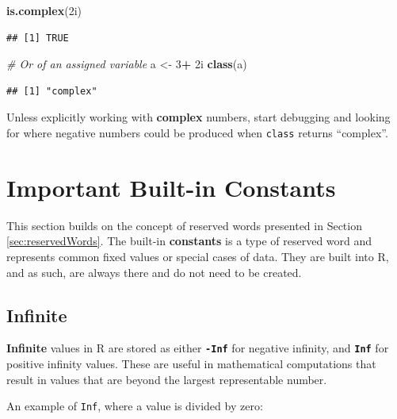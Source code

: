 \documentclass[
]{book}
\newenvironment{Shaded}{\begin{snugshade}}{\end{snugshade}}
\newcommand{\CommentTok}[1]{\textcolor[rgb]{0.56,0.35,0.01}{\textit{#1}}}
\newcommand{\DataTypeTok}[1]{\textcolor[rgb]{0.13,0.29,0.53}{#1}}
\newcommand{\DecValTok}[1]{\textcolor[rgb]{0.00,0.00,0.81}{#1}}
\newcommand{\FunctionTok}[1]{\textcolor[rgb]{0.13,0.29,0.53}{\textbf{#1}}}
\newcommand{\NormalTok}[1]{#1}
\newcommand{\OtherTok}[1]{\textcolor[rgb]{0.56,0.35,0.01}{#1}}
\newcommand{\SpecialCharTok}[1]{\textcolor[rgb]{0.81,0.36,0.00}{\textbf{#1}}}
\begin{document}
\begin{Shaded}
\begin{Highlighting}[]
\FunctionTok{is.complex}\NormalTok{(}\DecValTok{2}\DataTypeTok{i}\NormalTok{)}
\end{Highlighting}
\end{Shaded}

\begin{verbatim}
## [1] TRUE
\end{verbatim}

\begin{Shaded}
\begin{Highlighting}[]
\CommentTok{\# Or of an assigned variable}
\NormalTok{a }\OtherTok{\textless{}{-}} \DecValTok{3}\SpecialCharTok{+} \DecValTok{2}\DataTypeTok{i}
\FunctionTok{class}\NormalTok{(a)}
\end{Highlighting}
\end{Shaded}

\begin{verbatim}
## [1] "complex"
\end{verbatim}

Unless explicitly working with \textbf{complex} numbers, start debugging and looking for where negative numbers could be produced when \texttt{class} returns ``complex''.

\section{Important Built-in Constants}\label{sec:builtInConstants}

This section builds on the concept of reserved words presented in Section \ref{sec:reservedWords}. The built-in \textbf{constants} is a type of reserved word and represents common fixed values or special cases of data. They are built into R, and as such, are always there and do not need to be created.

\subsection{Infinite}\label{sec:infinite}

\textbf{Infinite} values in R are stored as either \textbf{\texttt{-Inf}} for negative infinity, and \textbf{\texttt{Inf}} for positive infinity values. These are useful in mathematical computations that result in values that are beyond the largest representable number.

An example of \texttt{Inf}, where a value is divided by zero:
\end{document}
